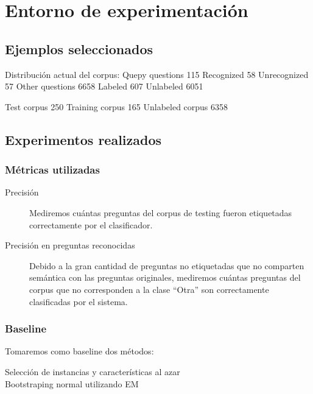 \section{Entorno de experimentación}

\subsection{Ejemplos seleccionados}

Distribución actual del corpus:
Quepy questions 115
	Recognized 58
	Unrecognized 57
Other questions 6658
	Labeled 607
	Unlabeled 6051

Test corpus 250
Training corpus 165
Unlabeled corpus 6358

\subsection{Experimentos realizados}


\subsubsection{Métricas utilizadas}
\begin{description}
    \item[Precisión] Mediremos cuántas preguntas del corpus de testing fueron etiquetadas correctamente por el clasificador.
    \item[Precisión en preguntas reconocidas] Debido a la gran cantidad de preguntas no etiquetadas que no comparten semántica con las preguntas originales, mediremos cuántas preguntas del corpus que no corresponden a la clase ``Otra'' son correctamente clasificadas por el sistema.
\end{description}

\subsubsection{Baseline}
Tomaremos como baseline dos métodos:
\begin{description}
    \item[Selección de instancias y características al azar]
    \item[Bootstraping normal utilizando EM]  %
\end{description}


